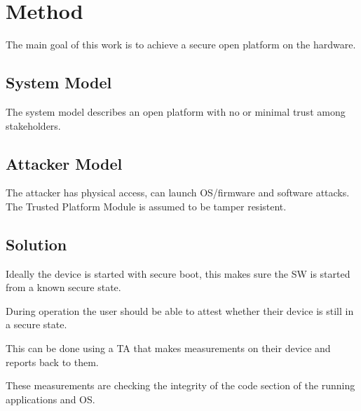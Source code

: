 \documentclass{report}
\begin{document}
\chapter{Method}

The main goal of this work is to achieve a secure open platform on the hardware.

\section{System Model}

The system model describes an open platform with no or minimal trust among stakeholders.

\section{Attacker Model}

The attacker has physical access, can launch OS/firmware and software attacks. The Trusted Platform Module is assumed to be tamper resistent.

\section{Solution}

Ideally the device is started with secure boot, this makes sure the SW is started from a known secure state. 
\medskip

During operation the user should be able to attest whether their device is still in a secure state.
\medskip

This can be done using a TA that makes measurements on their device and reports back to them.
\medskip

These measurements are checking the integrity of the code section of the running applications and OS.
\end{document}
